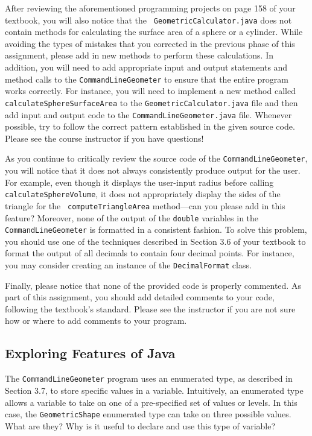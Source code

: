 \begin{sloppypar}
After reviewing the aforementioned programming projects on page 158 of your textbook, you will also notice that the {\tt
  GeometricCalculator.java} does not contain methods for calculating the surface area of a sphere or a cylinder.  While
avoiding the types of mistakes that you corrected in the previous phase of this assignment, please add in new methods
to perform these calculations. In addition, you will need to add appropriate input and output statements and method
calls to the {\tt CommandLineGeometer} to ensure that the entire program works correctly. For instance, you will need to
implement a new method called {\tt calculateSphereSurfaceArea} to the {\tt GeometricCalculator.java} file and then add
input and output code to the {\tt CommandLineGeometer.java} file. Whenever possible, try to follow the correct
pattern established in the given source code. Please see the course instructor if you have questions!
\end{sloppypar}

As you continue to critically review the source code of the {\tt CommandLineGeometer}, you will notice that it does not
always consistently produce output for the user.  For example, even though it displays the user-input radius before
calling {\tt calculateSphereVolume}, it does not appropriately display the sides of the triangle for the {\tt
  computeTriangleArea} method---can you please add in this feature? Moreover, none of the output of the {\tt double}
variables in the {\tt CommandLineGeometer} is formatted in a consistent fashion. To solve this problem, you should use
one of the techniques described in Section 3.6 of your textbook to format the output of all decimals to contain four
decimal points. For instance, you may consider creating an instance of the {\tt DecimalFormat} class.

Finally, please notice that none of the provided code is properly commented.  As part of this assignment, you should add
detailed comments to your code, following the textbook's standard. Please see the instructor if you are
not sure how or where to add comments to your program.

\vspace*{-.1in}
\subsection*{Exploring Features of Java}

The {\tt CommandLineGeometer} program uses an enumerated type, as described in Section 3.7, to store specific values in
a variable.  Intuitively, an enumerated type allows a variable to take on one of a pre-specified set of values or
levels.  In this case, the {\tt GeometricShape} enumerated type can take on three possible values.  What are they? Why
is it useful to declare and use this type of variable?

